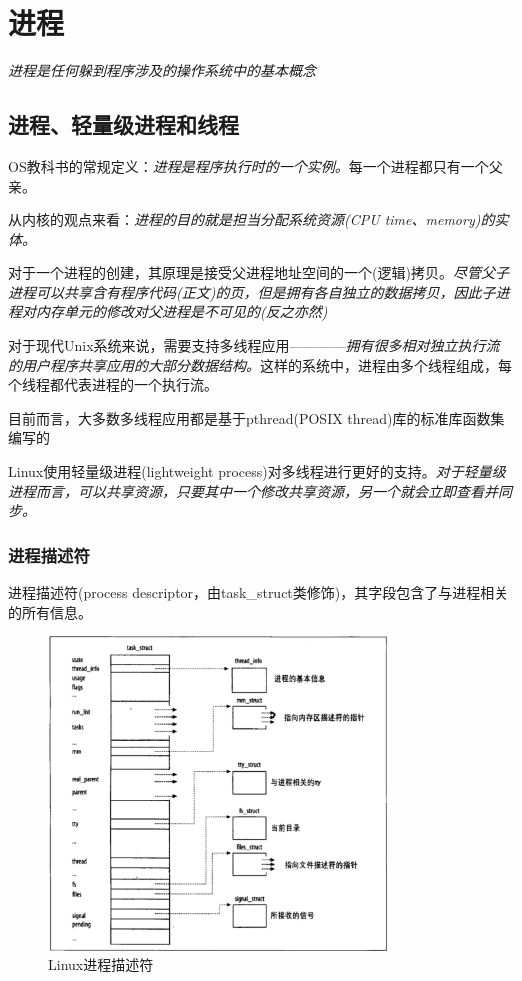 \chapter{进程}

    \emph{进程是任何躲到程序涉及的操作系统中的基本概念}

\section{进程、轻量级进程和线程}

    OS教科书的常规定义：\emph{进程是程序执行时的一个实例。}每一个进程都只有一个父亲。

    从内核的观点来看：\emph{进程的目的就是担当分配系统资源(CPU time、memory)的实体。}

    对于一个进程的创建，其原理是接受父进程地址空间的一个(逻辑)拷贝。\emph{尽管父子进程可以共享含有程序代码(正文)的页，但是拥有各自独立的数据拷贝，因此子进程对内存单元的修改对父进程是不可见的(反之亦然)}

    对于现代Unix系统来说，需要支持多线程应用————\emph{拥有很多相对独立执行流的用户程序共享应用的大部分数据结构。}这样的系统中，进程由多个线程组成，每个线程都代表进程的一个执行流。

    目前而言，大多数多线程应用都是基于pthread(POSIX thread)库的标准库函数集编写的

    Linux使用轻量级进程(lightweight process)对多线程进行更好的支持。\emph{对于轻量级进程而言，可以共享资源，只要其中一个修改共享资源，另一个就会立即查看并同步。}

\subsection{进程描述符}

    进程描述符(process descriptor，由task\_struct类修饰)，其字段包含了与进程相关的所有信息。

\begin{figure}[!htbp]
    \centering
    \includegraphics[width=0.8\textwidth]{image/chapter03/Linux进程描述符.png}
    \caption{Linux进程描述符}
\end{figure}

